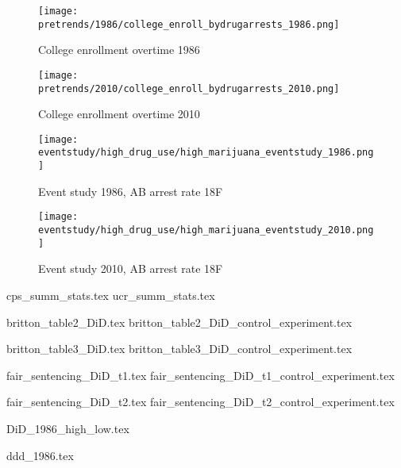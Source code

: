 \documentclass{article}
\begin{document}
\clearpage

\begin{figure}[h]
  \caption{College enrollment overtime 1986}
  \centering
  \texttt{[image: pretrends/1986/college\_enroll\_bydrugarrests\_1986.png]}
  \label{fig:TBD}
\end{figure}

\clearpage

\begin{figure}[h]
  \caption{College enrollment overtime 2010}
  \centering
  \texttt{[image: pretrends/2010/college\_enroll\_bydrugarrests\_2010.png]}
  \label{fig:TBD}
\end{figure}

\clearpage

\begin{figure}[h]
  \caption{Event study 1986, AB arrest rate 18F}
  \centering
  \texttt{[image: eventstudy/high\_drug\_use/high\_marijuana\_eventstudy\_1986.png]}
  \label{fig:TBD}
\end{figure}

\clearpage

\begin{figure}[h]
  \caption{Event study 2010, AB arrest rate 18F}
  \centering
  \texttt{[image: eventstudy/high\_drug\_use/high\_marijuana\_eventstudy\_2010.png]}
  \label{fig:TBD}
\end{figure}

\clearpage



{cps_summ_stats.tex}
{ucr_summ_stats.tex}


{britton_table2_DiD.tex}
{britton_table2_DiD_control_experiment.tex}

{britton_table3_DiD.tex}
{britton_table3_DiD_control_experiment.tex}

{fair_sentencing_DiD_t1.tex}
{fair_sentencing_DiD_t1_control_experiment.tex}

{fair_sentencing_DiD_t2.tex}
{fair_sentencing_DiD_t2_control_experiment.tex}

{DiD_1986_high_low.tex}

{ddd_1986.tex}
\end{document}
